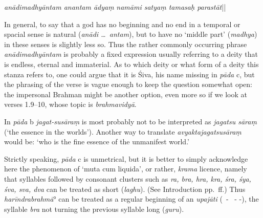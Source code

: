 {{  \textit{anādimadhyāntam anantam ādyaṃ} 
  \textit{namāmi satyaṃ tamasaḥ parastāt}\thinspace ||
  
 
  In general, to say that a god has no beginning and no end in a temporal or spacial sense is natural
  {\rm (}\textit{anādi \dots\ antam}{\rm )}, but to have no `middle part' {\rm (}\textit{madhya}{\rm )} in these senses is slightly less so.
  Thus the rather commonly occurring phrase \textit{anādimadhyāntam} is probably a fixed expression usually 
  referring to a deity that is endless, eternal and immaterial. 
  As to which deity or what form of a deity this stanza refers to, one could argue that 
  it is Śiva, his name missing in \textit{pāda} c, but the phrasing of the verse 
  is vague enough to keep the question somewhat open: the impersonal Brahman 
  might be another option, even more so if we look at verses 1.9--10, whose
  topic is \textit{brahmavidyā}.
 
 
  
 
  In \textit{pāda} b \textit{jagat-susāraṃ} is most probably not 
  to be interpreted as \textit{jagatsu sāraṃ} {\rm (}`the essence in the worlds'{\rm )}.
  Another way to translate \textit{avyaktajagatsusāraṃ} would be: 
  `who is the fine essence of the unmanifest world.'
 
  
 
  Strictly speaking, \textit{pāda} c is unmetrical, but it is better to 
  simply acknowledge here the phenomenon of `muta cum liquida', or rather,
  \textit{krama} licence, namely
  that syllables followed by consonant clusters such as 
  \textit{ra, bra, hra, kra, śra, śya, śva, sva, dva} can be treated as short {\rm (}\textit{laghu}{\rm )}.
  {\rm (}See Introduction pp.~\pageref{muta}\thinspace ff.{\rm )}
  Thus \textit{harīndrabrahmā}° can be treated as a regular beginning
  of an \textit{upajāti} {\rm (}\shortsyllable\ - \shortsyllable\ - -{\rm )}, the syllable 
  \textit{bra} not turning the previous syllable long {\rm (}\textit{guru}{\rm )}.
 
  
 
}}
